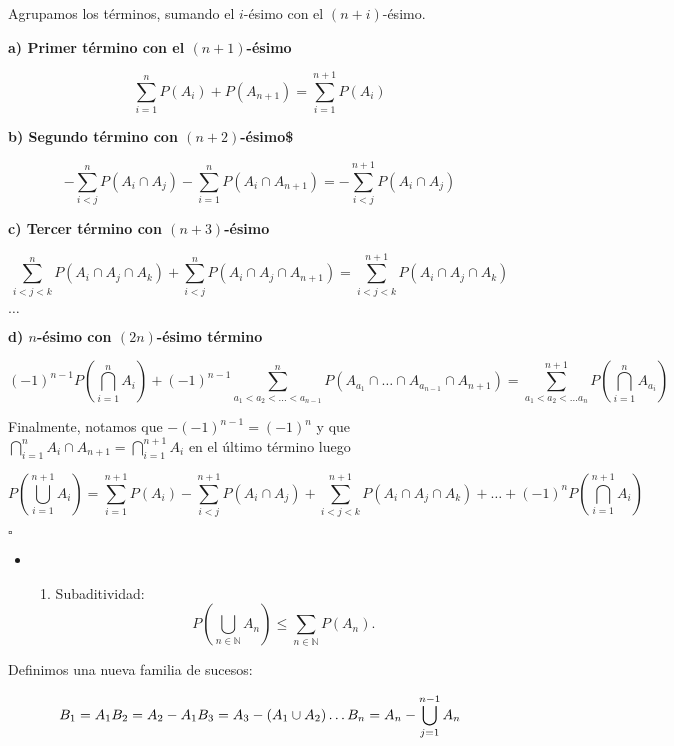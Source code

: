 Agrupamos los términos, sumando el \(i\)-ésimo con el \((n+i)\)-ésimo.

\textbf{a) Primer término con el \((n+1)\)-ésimo}

\[ \sum_{i=1}^n P(A_i) + P(A_{n+1}) = \sum_{i=1}^{n+1} P(A_i) \]

\textbf{b) Segundo término con \((n+2)\)-ésimo\$}

\[-\sum_{i < j}^n P(A_i \cap A_j) - \sum_{i=1}^n P(A_i \cap A_{n+1}) = -\sum_{i < j}^{n+1} P(A_i \cap A_j)\]

\textbf{c) Tercer término con \((n+3)\)-ésimo}

\[\sum_{i < j < k}^n P(A_i \cap A_j \cap A_k) + \sum_{i < j}^n P(A_i \cap A_j \cap A_{n+1}) = \sum_{i < j < k} ^{n+1} P(A_i \cap A_j \cap A_k)\]

\textbf{\(\dots\)}

\textbf{d) \(n\)-ésimo con \((2n)\)-ésimo término}

\[
(-1)^{n-1}P\left(\bigcap_{i=1}^n A_i \right) + (-1)^{n-1}\sum_{a_1 < a_2 < ... < a_{n - 1}}^n P\left(A_{a_1} \cap \dots \cap  A_{a_{n-1}} \cap A_{n+1}\right) = \sum_{a_1 < a_2 < \dots a_n}^{n+1} P\left(\bigcap_{i=1}^n A_{a_i}\right)
\]

Finalmente, notamos que \(-(-1)^{n-1} = (-1)^n\) y que
\(\bigcap_{i=1}^n A_i \cap A_{n+1} = \bigcap_{i=1}^{n+1} A_i\) en el
último término luego

\[
P\left(\bigcup_{i=1}^{n+1} A_i \right) = \sum_{i=1}^{n+1} P(A_i) - \sum_{i < j}^{n+1} P(A_i \cap A_j) + \sum_{i < j < k}^{n+1} P(A_i \cap A_j \cap A_k) + \dots  + (-1)^nP\left(\bigcap_{i=1}^{n+1} A_i \right)
\]

\(\square\)

\begin{itemize}
\item
  \begin{enumerate}
  \def\labelenumi{\alph{enumi})}
  \setcounter{enumi}{6}
  \tightlist
  \item
    Subaditividad: \[
    P\left(\bigcup_{n \in \mathbb{N}} A_n\right) \leq \sum_{n \in \mathbb{N}} P(A_n).
    \]
  \end{enumerate}
\end{itemize}

Definimos una nueva familia de sucesos:

\[
B_1 = A_1 \\
B_2 = A_2 - A_1 \\
B_3 = A_3 - (A_1 \cup A_2)
\dots \\
B_n = A_n - \bigcup_{j=1}^{n-1} A_n
\]

